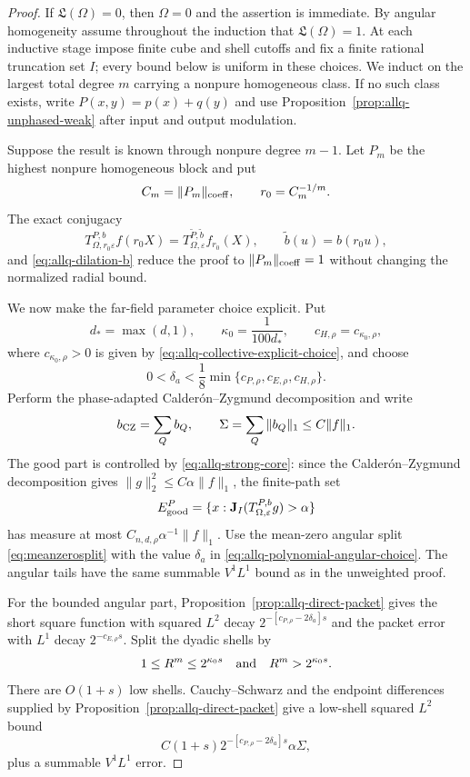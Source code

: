 \documentclass[11pt]{article}
\numberwithin{equation}{section}
\theoremstyle{remark}
\theoremstyle{definition}
\begin{document}
\begin{proof}
If $\mathfrak L(\Omega)=0$, then $\Omega=0$ and the assertion is
immediate. By angular homogeneity assume throughout the induction that
$\mathfrak L(\Omega)=1$.  At each inductive stage impose finite cube and
shell cutoffs and fix a finite rational truncation set $I$; every bound
below is uniform in these choices.  We induct on the largest total degree $m$
carrying a nonpure homogeneous class. If no such class exists, write
$P(x,y)=p(x)+q(y)$ and use
Proposition~\ref{prop:allq-unphased-weak} after input and output
modulation.

Suppose the result is known through nonpure degree $m-1$. Let $P_m$ be
the highest nonpure homogeneous block and put
\[
 C_m=\|P_m\|_{\rm coeff},\qquad r_0=C_m^{-1/m}.
\]
The exact conjugacy
\begin{equation}\label{eq:allq-weak-dilation-conjugacy}
 T^{P,b}_{\Omega,r_0\varepsilon}f(r_0X)
 =T^{\widetilde P,\widetilde b}_{\Omega,\varepsilon}f_{r_0}(X),
 \qquad
 \widetilde b(u)=b(r_0u),
\end{equation}
and \eqref{eq:allq-dilation-b} reduce the proof to
$\|P_m\|_{\rm coeff}=1$ without changing the normalized radial bound.

We now make the far-field parameter choice explicit. Put
\begin{equation}\label{eq:allq-polynomial-weak-parameters}
 d_*=\max(d,1),\qquad
 \kappa_0=\frac1{100d_*},\qquad
 c_{H,\rho}=c_{\kappa_0,\rho},
\end{equation}
where $c_{\kappa_0,\rho}>0$ is given by
\eqref{eq:allq-collective-explicit-choice}, and choose
\begin{equation}\label{eq:allq-polynomial-angular-choice}
 0<\delta_a<
 \frac18\min\{c_{P,\rho},c_{E,\rho},c_{H,\rho}\}.
\end{equation}
Perform the phase-adapted Calder\'on--Zygmund decomposition and write
\[
 b_{\rm CZ}=\sum_Qb_Q,\qquad
 \Sigma=\sum_Q\|b_Q\|_1\le C\|f\|_1.
\]
The good part is controlled by \eqref{eq:allq-strong-core}: since the
Calder\'on--Zygmund decomposition gives
$\|g\|_2^2\le C\alpha\|f\|_1$, the finite-path set
\[
 E_{\rm good}^P
 =\{x:\mathbf J_I(T^{P,b}_{\Omega,\varepsilon}g)>\alpha\}
\]
has measure at most $C_{n,d,\rho}\alpha^{-1}\|f\|_1$.  Use the
mean-zero angular split \eqref{eq:meanzerosplit} with the value
$\delta_a$ in \eqref{eq:allq-polynomial-angular-choice}. The angular
tails have the same summable $V^1L^1$ bound as in the unweighted proof.

For the bounded angular part, Proposition~\ref{prop:allq-direct-packet}
gives the short square function with squared $L^2$ decay
$2^{-[c_{P,\rho}-2\delta_a]s}$ and the packet error with $L^1$ decay
$2^{-c_{E,\rho}s}$. Split the dyadic shells by
\[
 1\le R^m\le2^{\kappa_0s}
 \quad\hbox{and}\quad
 R^m>2^{\kappa_0s}.
\]
There are $O(1+s)$ low shells. Cauchy--Schwarz and the endpoint
differences supplied by Proposition~\ref{prop:allq-direct-packet} give a
low-shell squared $L^2$ bound
\[
 C(1+s)2^{-[c_{P,\rho}-2\delta_a]s}\alpha\Sigma,
\]
plus a summable $V^1L^1$ error.


\end{proof}
\end{document}

